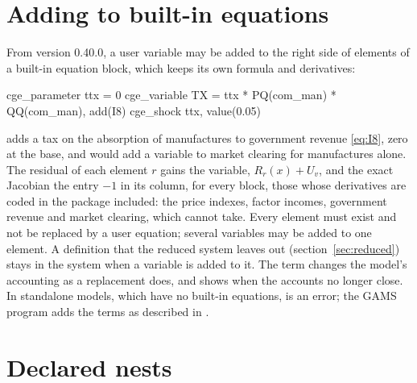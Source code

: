 \section{Adding to built-in equations}\label{sec:useradd}

From version 0.40.0, a user variable may be added to the right side of
elements of a built-in equation block, which keeps its own formula and
derivatives:
\begin{stcode}
cge_parameter ttx = 0
cge_variable TX = ttx * PQ(com_man) * QQ(com_man), add(I8)
cge_shock ttx, value(0.05)
\end{stcode}
adds a tax on the absorption of manufactures to government revenue
\eqref{eq:I8}, zero at the base, and  would add a variable to market
clearing for manufactures alone. The residual of each element $r$ gains the variable, $R_r(x) +
U_v$, and the exact Jacobian the entry $-1$ in its column, for every block,
those whose derivatives are coded in the package included: the price
indexes, factor incomes, government revenue and market clearing, which
 cannot take. Every element must exist and not be replaced
by a user equation; several variables may be added to one element. A
definition that the reduced system leaves out (section~\ref{sec:reduced})
stays in the system when a variable is added to it. The term changes the
model's accounting as a replacement does, and  shows when the
accounts no longer close. In standalone models, which have no built-in
equations,  is an error; the GAMS program adds the terms as
described in .

\section{Declared nests}\label{sec:usernests}

